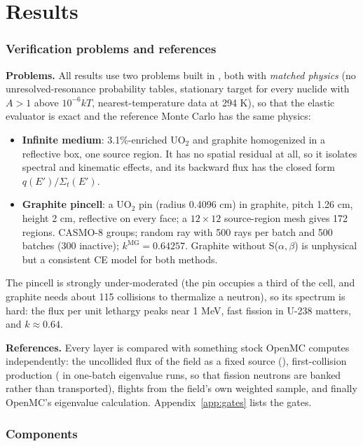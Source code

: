 \part{Results}\label{part:results}

\section{Verification problems and references}\label{sec:res:setup}

\textbf{Problems.} All results use two problems built in , both with
\emph{matched physics} (no unresolved-resonance probability tables, stationary target for every
nuclide with $A>1$ above $10^{-6}kT$, nearest-temperature data at 294 K), so that the elastic
evaluator is exact and the reference Monte Carlo has the same physics:
\begin{itemize}
\item \textbf{Infinite medium}: 3.1\%-enriched UO$_2$ and graphite homogenized in a reflective box,
  one source region. It has no spatial residual at all, so it isolates spectral and kinematic
  effects, and its backward flux has the closed form $q(E')/\Sigma_t(E')$.
\item \textbf{Graphite pincell}: a UO$_2$ pin (radius 0.4096 cm) in graphite, pitch 1.26 cm, height
  2 cm, reflective on every face; a $12\times12$ source-region mesh gives 172 regions. CASMO-8 groups;
  random ray with 500 rays per batch and 500 batches (300 inactive); $k^{\mathrm{MG}}=0.64257$.
  Graphite without S($\alpha,\beta$) is unphysical but a consistent CE model for both methods.
\end{itemize}
The pincell is strongly under-moderated (the pin occupies a third of the cell, and graphite needs
about 115 collisions to thermalize a neutron), so its spectrum is hard: the flux per unit lethargy
peaks near 1 MeV, fast fission in U-238 matters, and $k\approx0.64$.

\textbf{References.} Every layer is compared with something stock OpenMC computes independently: the
uncollided flux of the field as a fixed source (), first-collision
production ( in one-batch eigenvalue runs, so that fission neutrons are
banked rather than transported), flights from the field's own weighted sample, and finally OpenMC's
eigenvalue calculation. Appendix~\ref{app:gates} lists the gates.

\section{Components}\label{sec:res:components}

